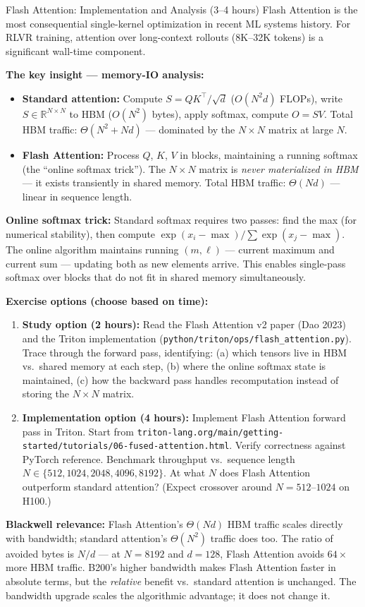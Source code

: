 \begin{exercise}{Flash Attention: Implementation and Analysis (3--4 hours)}
Flash Attention is the most consequential single-kernel optimization in recent ML systems history. For RLVR training, attention over long-context rollouts (8K--32K tokens) is a significant wall-time component.

\textbf{The key insight --- memory-IO analysis:}
\begin{itemize}
  \item \textbf{Standard attention:} Compute $S = QK^\top / \sqrt{d}$ ($O(N^2 d)$ FLOPs), write $S \in \mathbb{R}^{N \times N}$ to HBM ($O(N^2)$ bytes), apply softmax, compute $O = S V$. Total HBM traffic: $\Theta(N^2 + Nd)$ --- dominated by the $N \times N$ matrix at large $N$.
  \item \textbf{Flash Attention:} Process $Q$, $K$, $V$ in blocks, maintaining a running softmax (the ``online softmax trick''). The $N \times N$ matrix is \textit{never materialized in HBM} --- it exists transiently in shared memory. Total HBM traffic: $\Theta(Nd)$ --- linear in sequence length.
\end{itemize}

\textbf{Online softmax trick:} Standard softmax requires two passes: find the max (for numerical stability), then compute $\exp(x_i - \max) / \sum \exp(x_j - \max)$. The online algorithm maintains running $(m, \ell)$ --- current maximum and current sum --- updating both as new elements arrive. This enables single-pass softmax over blocks that do not fit in shared memory simultaneously.

\textbf{Exercise options (choose based on time):}
\begin{enumerate}
  \item \textbf{Study option (2 hours):} Read the Flash Attention v2 paper (Dao 2023) and the Triton implementation (\texttt{python/triton/ops/flash\_attention.py}). Trace through the forward pass, identifying: (a) which tensors live in HBM vs.\ shared memory at each step, (b) where the online softmax state is maintained, (c) how the backward pass handles recomputation instead of storing the $N \times N$ matrix.
  \item \textbf{Implementation option (4 hours):} Implement Flash Attention forward pass in Triton. Start from \texttt{triton-lang.org/main/getting-started/tutorials/06-fused-attention.html}. Verify correctness against PyTorch reference. Benchmark throughput vs.\ sequence length $N \in \{512, 1024, 2048, 4096, 8192\}$. At what $N$ does Flash Attention outperform standard attention? (Expect crossover around $N = 512$--$1024$ on H100.)
\end{enumerate}

\textbf{Blackwell relevance:} Flash Attention's $\Theta(Nd)$ HBM traffic scales directly with bandwidth; standard attention's $\Theta(N^2)$ traffic does too. The ratio of avoided bytes is $N/d$ --- at $N=8192$ and $d=128$, Flash Attention avoids $64\times$ more HBM traffic. B200's higher bandwidth makes Flash Attention faster in absolute terms, but the \textit{relative} benefit vs.\ standard attention is unchanged. The bandwidth upgrade scales the algorithmic advantage; it does not change it.
\end{exercise}

